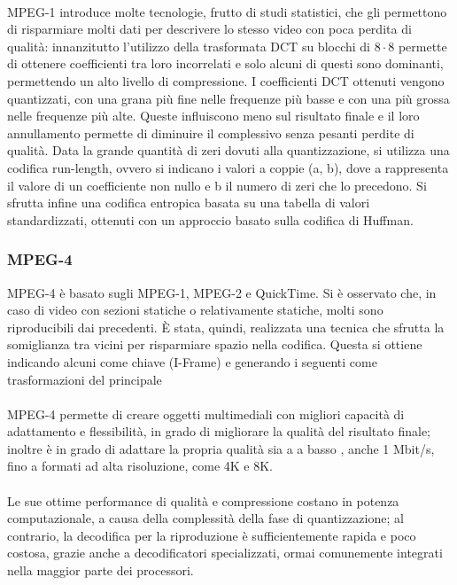 			\paragraph*{}
			MPEG-1 introduce molte tecnologie, frutto di studi statistici, che gli permettono di risparmiare molti dati per descrivere lo stesso video con poca perdita di qualità: innanzitutto l'utilizzo della \gls{trasformata DCT} su blocchi di \(8\cdot8\) permette di ottenere coefficienti tra loro incorrelati e solo alcuni di questi sono dominanti, permettendo un alto livello di compressione. I coefficienti \gls{DCT} ottenuti vengono quantizzati, con una grana più fine nelle frequenze più basse e con una più grossa nelle frequenze più alte. Queste influiscono meno sul risultato finale e il loro annullamento permette di diminuire il  complessivo senza pesanti perdite di qualità.
			Data la grande quantità di zeri dovuti alla quantizzazione, si utilizza una codifica run-length, ovvero si indicano i valori a coppie (a, b), dove a rappresenta il valore di un coefficiente non nullo e b il numero di zeri che lo precedono. Si sfrutta infine una codifica entropica basata su una tabella di valori standardizzati, ottenuti con un approccio basato sulla codifica di Huffman.

		\subsubsection{MPEG-4}
			MPEG-4 è basato sugli  MPEG-1, MPEG-2 e QuickTime. Si è osservato che, in caso di video con sezioni statiche o relativamente statiche, molti  sono riproducibili dai precedenti. È stata, quindi, realizzata una tecnica che sfrutta la somiglianza tra  vicini per risparmiare spazio nella codifica. Questa si ottiene indicando alcuni  come  chiave (I-Frame) e generando i  seguenti come trasformazioni del  principale
			\paragraph*{}
			MPEG-4 permette di creare oggetti multimediali con migliori capacità di adattamento e flessibilità, in grado di migliorare la qualità del risultato finale; inoltre è in grado di adattare la propria qualità sia a  a basso , anche 1 Mbit/s, fino a formati ad alta risoluzione, come 4K e 8K.
			\paragraph*{}
			Le sue ottime performance di qualità e compressione costano in potenza computazionale, a causa della complessità della fase di quantizzazione; al contrario, la decodifica per la riproduzione è sufficientemente rapida e poco costosa, grazie anche a decodificatori  specializzati, ormai comunemente integrati nella maggior parte dei processori.

